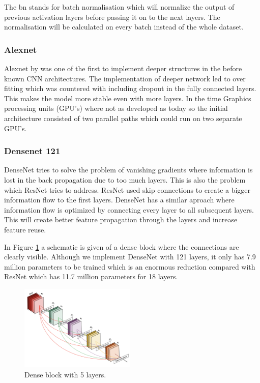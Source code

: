 		The bn stands for batch normalisation which will normalize the output of previous activation layers before passing it on to the next layers. The normalisation will be calculated on every batch instead of the whole dataset.
		
		\subsubsection{Alexnet}
		Alexnet by \cite{Krizhevsky2017} was one of the first to implement deeper structures in the before known CNN architectures. The implementation of deeper network led to over fitting which was countered with including dropout in the fully connected layers. This makes the model more stable even with more layers. In the time Graphics processing units (GPU's) where not as developed as today so the initial architecture consisted of two parallel paths which could run on two separate GPU's. 
		
		\subsubsection{Densenet 121}
		DenseNet \citep{Huang2017} tries to solve the problem of vanishing gradients where information is lost in the back propagation due to too much layers. This is also the problem which ResNet tries to address. ResNet used skip connections to create a bigger information flow to the first layers. DenseNet has a similar aproach where information flow is optimized by connecting every layer to all subsequent layers. This will create better feature propagation through the layers and increase feature reuse. 
		
		In Figure \ref{fig:lit:va:denseblock} a schematic is given of a dense block where the connections are clearly visible. Although we implement DenseNet with 121 layers, it only has 7.9 million parameters to be trained which is an enormous reduction compared with ResNet which has 11.7 million parameters for 18 layers.
		
		\begin{figure}[hbtp]
		\centering
		\includegraphics[width=0.49\textwidth]{fig/Research/Vision_Algorithm/algorithms/Densenet/Dense_block.png}
		\caption{Dense block with 5 layers. \citep{Huang2017}}
		\label{fig:lit:va:denseblock}
		\end{figure}
		
